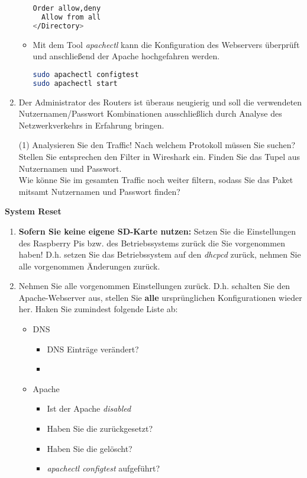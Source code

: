 \documentclass[paper=a4,fontsize=11pt]{scrartcl}%
\begin{document}
\begin{enumerate}
\begin{itemize}
\begin{lstlisting}[style=Bash, language=Bash]
  Order allow,deny
  Allow from all
</Directory>
\end{lstlisting} \label{conf}
	\item Mit dem Tool \emph{apachectl} kann die Konfiguration des Webservers überprüft und anschließend der Apache hochgefahren werden.
\begin{lstlisting}[style=Bash, language=Bash]
sudo apachectl configtest
sudo apachectl start
\end{lstlisting} \label{apchectl}
	\end{itemize}
	\item Der Administrator des Routers ist überaus neugierig und soll die verwendeten Nutzernamen/Passwort Kombinationen ausschließlich durch Analyse des Netzwerkverkehrs in Erfahrung bringen.
		\begin{tasks}(1)
			\task Analysieren Sie den Traffic! Nach welchem Protokoll müssen Sie suchen?
			\task Stellen Sie entsprechen den Filter in Wireshark ein.
			\task Finden Sie das Tupel aus Nutzernamen und Passwort.\\
		Wie könne Sie im gesamten Traffic noch weiter filtern, sodass Sie das Paket mitsamt Nutzernamen und Passwort finden?
		\end{tasks}
\end{enumerate}

\begin{center}\Large{\textbf{System Reset}}\end{center}\vskip0.25in
\begin{enumerate}
	\item \textbf{Sofern Sie keine eigene SD-Karte nutzen:} Setzen Sie die Einstellungen des Raspberry Pis bzw. des Betriebssystems zurück die Sie vorgenommen haben! D.h. setzen Sie das Betriebssystem auf den \emph{dhcpcd} zurück, nehmen Sie alle vorgenommen Änderungen zurück.
	\item Nehmen Sie alle vorgenommen Einstellungen zurück. D.h. schalten Sie den Apache-Webserver aus, stellen Sie \textbf{alle} ursprünglichen Konfigurationen wieder her. Haken Sie zumindest folgende Liste ab:
	\begin{itemize}
	\item DNS
	\begin{itemize}
		\item DNS Einträge verändert?
		\item {}
	\end{itemize}
	\item Apache
	\begin{itemize}
		\item Ist der Apache \emph{disabled}
		\item Haben Sie die  zurückgesetzt?
		\item Haben Sie die  gelöscht?
		\item \emph{apachectl configtest} aufgeführt?
	\end{itemize}
\end{itemize}
\end{enumerate}
\end{document}
